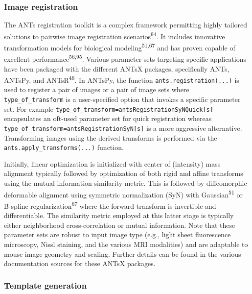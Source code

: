 \documentclass[
  12pt,
]{article}
\begin{document}
\subsubsection{Image registration}\label{image-registration}

The ANTs registration toolkit is a complex framework permitting highly
tailored solutions to pairwise image registration
scenarios\textsuperscript{94}. It includes innovative transformation
models for biological modeling\textsuperscript{51,67} and has proven
capable of excellent performance\textsuperscript{56,95}. Various
parameter sets targeting specific applications have been packaged with
the different ANTsX packages, specifically ANTs, ANTsPy, and
ANTsR\textsuperscript{46}. In ANTsPy, the function
\texttt{ants.registration(...)} is used to register a pair of images or
a pair of image sets where \texttt{type\_of\_transform} is a
user-specified option that invokes a specific parameter set. For example
\texttt{type\_of\_transform=\textquotesingle{}antsRegistrationSyNQuick{[}s{]}\textquotesingle{}}
encapsulates an oft-used parameter set for quick registration whereas
\texttt{type\_of\_transform=\textquotesingle{}antsRegistrationSyN{[}s{]}\textquotesingle{}}
is a more aggressive alternative. Transforming images using the derived
transforms is performed via the \texttt{ants.apply\_transforms(...)}
function.

Initially, linear optimization is initialized with center of (intensity)
mass alignment typically followed by optimization of both rigid and
affine transforms using the mutual information similarity metric. This
is followed by diffeomorphic deformable alignment using symmetric
normalization (SyN) with Gaussian\textsuperscript{51} or B-spline
regularization\textsuperscript{67} where the forward transform is
invertible and differentiable. The similarity metric employed at this
latter stage is typically either neighborhood cross-correlation or
mutual information. Note that these parameter sets are robust to input
image type (e.g., light sheet fluorescence microscopy, Nissl staining,
and the various MRI modalities) and are adaptable to mouse image
geometry and scaling. Further details can be found in the various
documentation sources for these ANTsX packages.

\subsubsection{Template generation}\label{template-generation}
\end{document}
